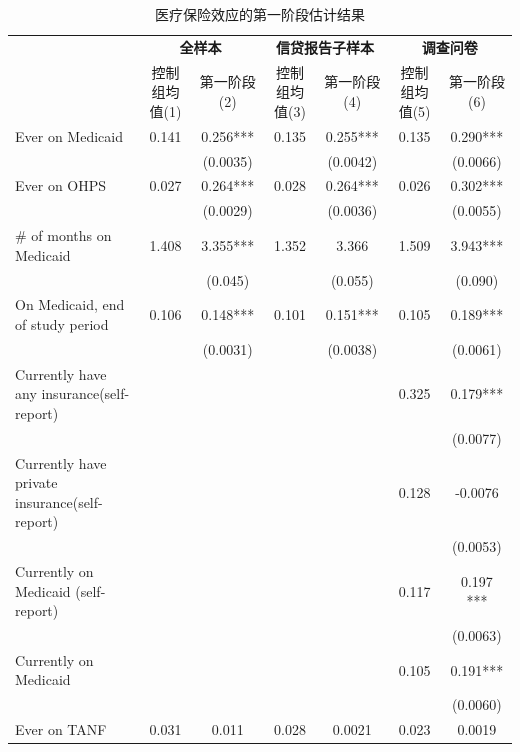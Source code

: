 \documentclass[cn,12pt,math=newtx,citestyle=gb7714-2015,bibstyle=gb7714-2015]{elegantbook}
\begin{document}
		\begin{table}[htbp]\centering
		\scriptsize
		\caption{医疗保险效应的第一阶段估计结果}
		\label{2sls_2}
		\begin{center}
			\begin{threeparttable}
				\begin{tabular}{lcccccc}
					\toprule
					\multicolumn{1}{l}{}&
					\multicolumn{2}{c}{\textbf{全样本}} &\multicolumn{2}{c}{\textbf{信贷报告子样本}}&\multicolumn{2}{c}{\textbf{调查问卷}}\\
					\multicolumn{1}{c}{}&
					\multicolumn{1}{c}{控制组均值(1)} &
					\multicolumn{1}{c}{第一阶段(2)} &
					\multicolumn{1}{c}{控制组均值(3)} &
					\multicolumn{1}{c}{第一阶段(4)}&
					\multicolumn{1}{c}{控制组均值(5)} &
					\multicolumn{1}{c}{第一阶段(6)}\\
					\midrule
					Ever on Medicaid                &       0.141&       0.256***&0.135&0.255***&0.135&0.290*** \\
					&       &     (0.0035)  &&(0.0042)&&(0.0066) \\
					Ever on OHPS              &       0.027&       0.264***&0.028&0.264***&0.026&0.302***\\
					&      &     (0.0029) &&(0.0036) &&(0.0055) \\
					\# of months on Medicaid               &      1.408&      3.355***&1.352&3.366&1.509&3.943***\\
					&       &     (0.045)  &&(0.055)&&(0.090) \\
					On Medicaid, end of study period               &      0.106&     0.148***&0.101&0.151***&0.105&0.189***\\
					&        &     (0.0031)  &&(0.0038)&&(0.0061) \\
					Currently have any insurance(self-report)            &      &   &&&0.325&0.179***   \\
					&       &     &  &&&(0.0077) \\
					Currently have private insurance(self-report)               &       &    &&&0.128&-0.0076   \\
					&        &    &&&&(0.0053)    \\
					Currently on Medicaid (self-report)& &&&&0.117&0.197 ***\\
					&       &&&&&(0.0063)\\
					Currently on Medicaid& &&&&0.105&0.191***\\
					&&&&&&(0.0060)\\
				    Ever on TANF    & 0.031 & 0.011&0.028&0.0021&0.023&0.0019\\

\end{tabular}
\end{threeparttable}
\end{center}
\end{table}
\end{document}
